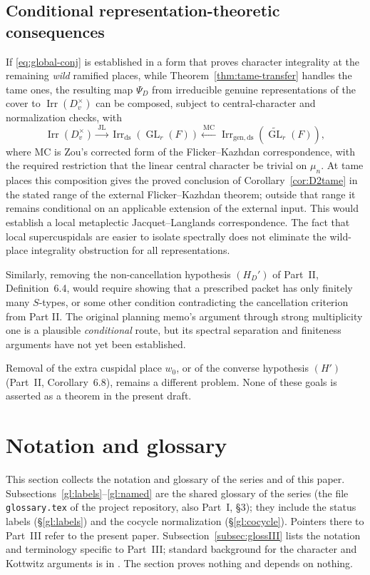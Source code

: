 \documentclass[11pt]{article}
\newcommand{\GL}{\operatorname{GL}}
\newcommand{\Irr}{\operatorname{Irr}}
\newcommand{\JL}{\mathrm{JL}}
\theoremstyle{plain}
\theoremstyle{definition}
\begin{document}
\subsection{Conditional representation-theoretic consequences}
If \eqref{eq:global-conj} is established in a form that proves character integrality at the remaining \emph{wild} ramified places, while Theorem~\ref{thm:tame-transfer} handles the tame ones, the resulting map $\Psi_D$ from irreducible genuine representations of the cover to $\Irr(D_v^\times)$ can be composed, subject to central-character and normalization checks, with
\[
\Irr(D_v^\times)\xrightarrow{\ \JL\ }
\Irr_{\mathrm{ds}}(\GL_r(F))
\xleftarrow{\ \mathrm{MC}\ }
\Irr_{\mathrm{gen,ds}}(\widetilde{\GL}_r(F)),
\]
where $\mathrm{MC}$ is Zou's corrected form of the Flicker--Kazhdan correspondence, with the required restriction that the linear central character be trivial on $\mu_n$. At tame places this composition gives the proved conclusion of
Corollary~\ref{cor:D2tame} in the stated range of the external
Flicker--Kazhdan theorem; outside that range it remains conditional
on an applicable extension of the external input.
This would establish a local metaplectic Jacquet--Langlands correspondence. The fact that local supercuspidals are easier to isolate spectrally does not eliminate the wild-place integrality obstruction for all representations.

Similarly, removing the non-cancellation hypothesis $(H_D')$ of Part~II, Definition~6.4, would require showing that a prescribed packet has only finitely many $S$-types, or some other condition contradicting the cancellation criterion from Part II. The original planning memo's argument through strong multiplicity one is a plausible \emph{conditional} route, but its spectral separation and finiteness arguments have not yet been established.

Removal of the extra cuspidal place $w_0$, or of the converse hypothesis $(H')$ (Part~II, Corollary~6.8), remains a different problem. None of these goals is asserted as a theorem in the present draft.



\section{Notation and glossary}\label{sec:glossary}
This section collects the notation and glossary of the series and of this paper. Subsections~\ref{gl:labels}--\ref{gl:named} are the shared glossary of the series (the file \texttt{glossary.tex} of the project repository, also Part~I, \S3); they include the status labels (\S\ref{gl:labels}) and the cocycle normalization (\S\ref{gl:cocycle}). Pointers there to Part~III refer to the present paper. Subsection~\ref{subsec:glossIII} lists the notation and terminology specific to Part~III; standard background for the character and Kottwitz arguments is in \cite{Atiyah66,SegalK,Kottwitz84,MilneADT}. The section proves nothing and depends on nothing.
\end{document}
